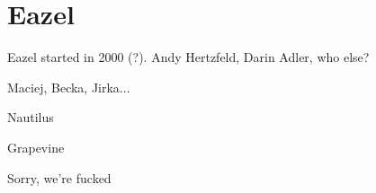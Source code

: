 \chapter{Eazel}

Eazel started in 2000 (?).  Andy Hertzfeld, Darin Adler, who else?

Maciej, Becka, Jirka...

Nautilus

Grapevine

Sorry, we're fucked
